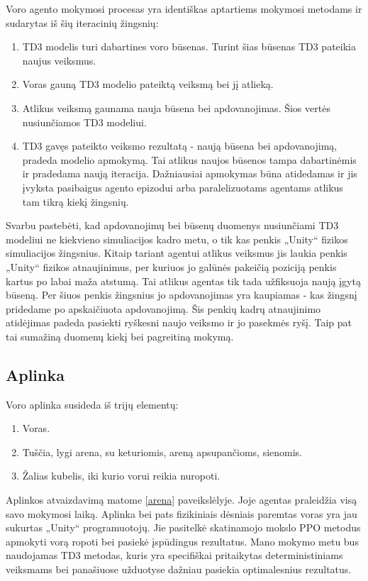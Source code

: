 \documentclass[a4paper, 12pt]{article}
\begin{document}
Voro agento mokymosi procesas yra identiškas aptartiems mokymosi metodams ir sudarytas iš šių iteracinių žingsnių:

\begin{enumerate}
  \addtolength{\itemsep}{-0.5\baselineskip} 
  \item TD3 modelis turi dabartines voro būsenas. Turint šias būsenas TD3 pateikia naujus veiksmus.
  \item Voras gauną TD3 modelio pateiktą veiksmą bei jį atlieką.
  \item Atlikus veiksmą gaunama nauja būsena bei apdovanojimas. Šios vertės nusiunčiamos TD3 modeliui. 
  \item TD3 gavęs pateikto veiksmo rezultatą - naują būsena bei apdovanojimą, pradeda modelio apmokymą. Tai atlikus naujos būsenos tampa dabartinėmis ir pradedama naują iteracija. Dažniausiai apmokymas būna atidedamas ir jis įvyksta pasibaigus agento epizodui arba paralelizuotams agentams atlikus tam tikrą kiekį žingsnių.
\end{enumerate}


Svarbu pastebėti, kad apdovanojimų bei būsenų duomenys nusiunčiami TD3 modeliui ne kiekvieno simuliacijos kadro metu, o tik kas penkis „Unity“ fizikos simuliacijos žingsnius. Kitaip tariant agentui atlikus veiksmus jis laukia penkis „Unity“ fizikos atnaujinimus, per kuriuos jo galūnės pakeičią poziciją penkis kartus po labai maža atstumą. Tai atlikus agentas tik tada užfiksuoja naują įgytą būseną. Per šiuos penkis žingsnius jo apdovanojimas yra kaupiamas - kas žingsnį pridedame po apskaičiuota apdovanojimą. Šis penkių kadrų atnaujinimo atidėjimas padeda pasiekti ryškesni naujo veiksmo ir jo pasekmės ryšį. Taip pat tai sumažiną duomenų kiekį bei pagreitiną mokymą.

\subsection{Aplinka}

Voro aplinka susideda iš trijų elementų:
\begin{enumerate}
  \addtolength{\itemsep}{-0.5\baselineskip} 
  \item Voras.
  \item Tuščia, lygi arena, su keturiomis, areną apsupančioms, sienomis.
  \item Žalias kubelis, iki kurio vorui reikia nuropoti.
\end{enumerate}

Aplinkos atvaizdavimą matome \ref{arena} paveikslėlyje. Joje agentas praleidžia visą savo mokymosi laiką. Aplinka bei pats fizikiniais dėsniais paremtas voras yra jau sukurtas „Unity“ programuotojų. Jie pasitelkė skatinamojo mokslo PPO metodus apmokyti vorą ropoti bei pasiekė įspūdingus rezultatus. Mano mokymo metu bus naudojamas TD3 metodas, kuris yra specifiškai pritaikytas deterministiniams veiksmams bei panašiuose užduotyse dažniau pasiekia optimalesnius rezultatus. 
\end{document}
